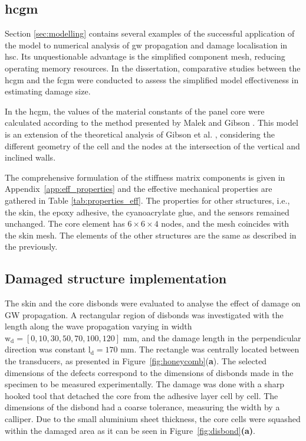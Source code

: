 \documentclass[a4paper,fleqn]{cas-dc}
\begin{document}
\subsection{\Acl{hcgm}}
\label{sec:homogenised}

Section \ref{sec:modelling} contains several examples of the successful application of the model to numerical analysis of \ac{gw} propagation and damage localisation in \ac{hsc}.
Its unquestionable advantage is the simplified component mesh, reducing operating memory resources.
In the dissertation, comparative studies between the \ac{hcgm} and the \ac{fcgm} were conducted to assess the simplified model effectiveness in estimating damage size.

In the \ac{hcgm}, the values of the material constants of the panel core were calculated according to the method presented by Malek and Gibson \cite{malek2015effective}.
This model is an extension of the theoretical analysis of Gibson et al. \cite{gibson1982mechanics}, considering the different geometry of the cell and the nodes at the intersection of the vertical and inclined walls.

The comprehensive formulation of the stiffness matrix components is given in Appendix~\ref{app:eff_properties} and the effective mechanical properties are gathered in Table \ref{tab:properties_eff}.
The properties for other structures, i.e., the skin, the epoxy adhesive, the cyanoacrylate glue, and the sensors remained unchanged.
The core element has \(6 \times 6 \times 4\) nodes, and the mesh coincides with the skin mesh.
The elements of the other structures are the same as described in the previously.

\subsection{Damaged structure implementation}
\label{sec:disbond}
The skin and the core disbonds were evaluated to analyse the effect of damage on GW propagation.
A rectangular region of disbonds was investigated with the length along the wave propagation varying in width \(\mathrm{w_d} = [0,10,30,50,70,100,120]\) mm, and the damage length in the perpendicular direction was constant \(\mathrm{l_d} = 170\) mm.
The rectangle was centrally located between the transducers, as presented in Figure~\ref{fig:honeycomb}(\textbf{a}).
The selected dimensions of the defects correspond to the dimensions of disbonds made in the specimen to be measured experimentally.
The damage was done with a sharp hooked tool that detached the core from the adhesive layer cell by cell.
The dimensions of the disbond had a coarse tolerance, measuring the width by a calliper.
Due to the small aluminium sheet thickness, the core cells were squashed within the damaged area as it can be seen in Figure~\ref{fig:disbond}\textbf{(a)}.
\end{document}
